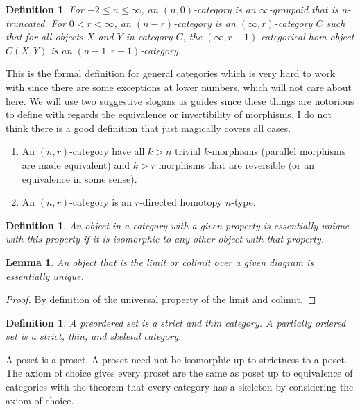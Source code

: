 \documentclass{tufte-book}
\newtheorem{definition}[theorem]{Definition}
\newtheorem{lemma}[theorem]{Lemma}
\begin{document}
 \begin{definition}
 	For $-2 \leq n \leq \infty$, an $(n,0)$-category is an $\infty$-groupoid that is $n$-truncated. For $0 < r < \infty$, an $(n-r)$-category is an $(\infty,r)$-category $C$ such that for all objects $X$ and $Y$ in category $C$, the $(\infty, r-1)$-categorical hom object $C(X,Y)$ is an $(n-1,r-1)$-category.
 \end{definition}
 
 This is the formal definition for general categories which is very hard to work with since there are some exceptions at lower numbers, which will not care about here. We will use two suggestive slogans as guides since these things are notorious to define with regards the equivalence or invertibility of morphisms. I do not think there is a good definition that just magically covers all cases.
 
 \begin{enumerate}
 	\item An $(n,r)$-category have all $k > n$ trivial $k$-morphisms (parallel morphisms are made equivalent) and $k > r$ morphisms that are reversible (or an equivalence in some sense).
 	\item An $(n,r)$-category is an $r$-directed homotopy $n$-type.
 \end{enumerate}
 
 \begin{definition}
 	An object in a category with a given property is essentially unique with this property if it is isomorphic to any other object with that property.
 \end{definition}
 
 \begin{lemma}
 	An object that is the limit or colimit over a given diagram is essentially unique. 
 \end{lemma}
 
 \begin{proof}
 	By definition of the universal property of the limit and colimit.
 \end{proof}
 
 \begin{definition}
 	A preordered set is a strict and thin category. A partially ordered set is a strict, thin, and skeletal category.
 \end{definition}
 
 A poset is a proset. A proset need not be isomorphic up to strictness to a poset. The axiom of choice gives every proset are the same as poset up to equivalence of categories with the theorem that every category has a skeleton by considering the axiom of choice.
 
\end{document}
